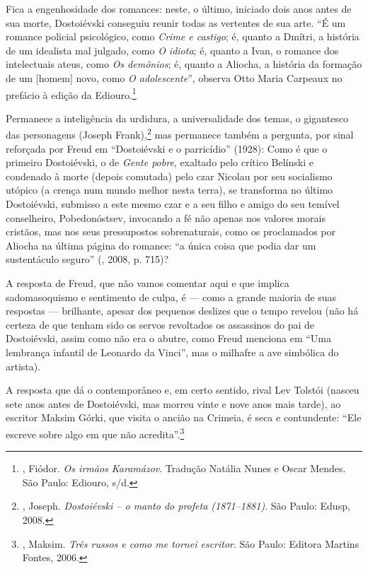 Fica a engenhosidade dos romances: neste, o último, iniciado dois anos antes de sua morte, Dostoiévski conseguiu reunir todas as vertentes de sua arte. ``É um romance policial psicológico, como \emph{Crime e castigo}; é, quanto a Dmítri, a história de um idealista mal julgado, como \emph{O idiota}; é, quanto a Ivan, o romance dos intelectuais ateus, como \emph{Os demônios}; é, quanto a Aliocha, a história da formação de um [homem] novo, como \emph{O adolescente}'', observa Otto Maria Carpeaux no prefácio à edição da Ediouro.\footnote{, Fiódor. \emph{Os irmãos Karamázov}. Tradução Natália Nunes e Oscar Mendes. São Paulo: Ediouro, s/d.}

Permanece a inteligência da urdidura, a universalidade dos temas, o gigantesco das personagens (Joseph Frank),\footnote{, Joseph. \emph{Dostoiévski -- o manto do profeta (1871--1881)}. São Paulo: Edusp, 2008.} mas permanece também a pergunta, por sinal reforçada por Freud em ``Dostoiévski e o parricídio'' (1928): Como é que o primeiro Dostoiévski, o de \emph{Gente pobre}, exaltado pelo crítico Belínski e condenado à morte (depois comutada) pelo czar Nicolau  por seu socialismo utópico (a crença num mundo melhor nesta terra), se transforma no último Dostoiévski, submisso a este mesmo czar e a seu filho e amigo do seu temível conselheiro, Pobedonóstsev, invocando a fé não apenas nos valores morais cristãos, mas nos seus pressupostos
sobrenaturais, como os proclamados por Aliocha na última página do romance: ``a única coisa que podia dar um sustentáculo seguro'' (, 2008, p. 715)?

A resposta de Freud, que não vamos comentar aqui e que implica sadomasoquismo e sentimento de culpa, é --- como a grande maioria de suas respostas --- brilhante, apesar dos pequenos deslizes que o tempo revelou (não há certeza de que tenham sido os servos revoltados os assassinos do pai de Dostoiévski, assim como não era o abutre, como Freud menciona em ``Uma lembrança infantil de Leonardo da Vinci'', mas o milhafre a ave simbólica do artista).

A resposta que dá o contemporâneo e, em certo sentido, rival Lev Tolstói (nasceu sete anos antes de Dostoiévski, mas morreu vinte e nove anos mais tarde), ao escritor Maksim Górki, que visita o ancião na Crimeia, é seca e contundente: ``Ele escreve sobre algo em que não acredita''.\footnote{, Maksim. \emph{Três russos e como me tornei escritor}. São Paulo: Editora Martins Fontes, 2006.}

